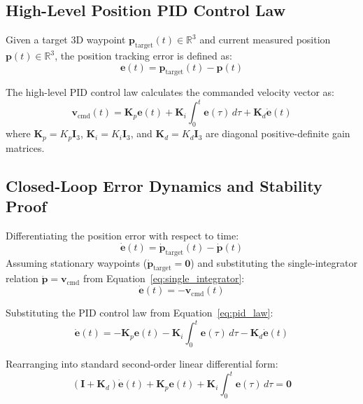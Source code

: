 \documentclass[11pt,a4paper]{article}
\begin{document}
\subsection{High-Level Position PID Control Law}
Given a target 3D waypoint $\mathbf{p}_{\mathrm{target}}(t) \in \mathbb{R}^3$ and current measured position $\mathbf{p}(t) \in \mathbb{R}^3$, the position tracking error is defined as:
\begin{equation}
\mathbf{e}(t) = \mathbf{p}_{\mathrm{target}}(t) - \mathbf{p}(t)
\end{equation}

The high-level PID control law calculates the commanded velocity vector as:
\begin{equation}
\mathbf{v}_{\mathrm{cmd}}(t) = \mathbf{K}_p \mathbf{e}(t) + \mathbf{K}_i \int_0^t \mathbf{e}(\tau)\,d\tau + \mathbf{K}_d \mathbf{\dot{e}}(t)
\label{eq:pid_law}
\end{equation}
where $\mathbf{K}_p = K_p \mathbf{I}_3$, $\mathbf{K}_i = K_i \mathbf{I}_3$, and $\mathbf{K}_d = K_d \mathbf{I}_3$ are diagonal positive-definite gain matrices.

\subsection{Closed-Loop Error Dynamics and Stability Proof}
Differentiating the position error with respect to time:
\begin{equation}
\mathbf{\dot{e}}(t) = \mathbf{\dot{p}}_{\mathrm{target}}(t) - \mathbf{\dot{p}}(t)
\end{equation}
Assuming stationary waypoints ($\mathbf{\dot{p}}_{\mathrm{target}} = \mathbf{0}$) and substituting the single-integrator relation $\mathbf{\dot{p}} = \mathbf{v}_{\mathrm{cmd}}$ from Equation~\eqref{eq:single_integrator}:
\begin{equation}
\mathbf{\dot{e}}(t) = -\mathbf{v}_{\mathrm{cmd}}(t)
\end{equation}

Substituting the PID control law from Equation~\eqref{eq:pid_law}:
\begin{equation}
\mathbf{\dot{e}}(t) = -\mathbf{K}_p \mathbf{e}(t) - \mathbf{K}_i \int_0^t \mathbf{e}(\tau)\,d\tau - \mathbf{K}_d \mathbf{\dot{e}}(t)
\end{equation}

Rearranging into standard second-order linear differential form:
\begin{equation}
(\mathbf{I} + \mathbf{K}_d) \mathbf{\dot{e}}(t) + \mathbf{K}_p \mathbf{e}(t) + \mathbf{K}_i \int_0^t \mathbf{e}(\tau)\,d\tau = \mathbf{0}
\end{equation}
\end{document}
